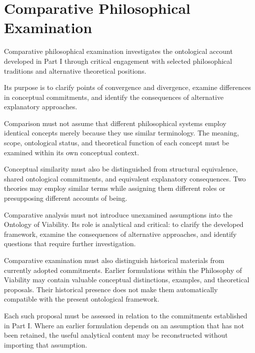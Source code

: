 
\section*{Comparative Philosophical Examination}

Comparative philosophical examination investigates
the ontological account developed in Part I through
critical engagement with selected philosophical
traditions and alternative theoretical positions.

Its purpose is to clarify points of convergence and
divergence, examine differences in conceptual commitments,
and identify the consequences of alternative explanatory
approaches.

Comparison must not assume that different philosophical
systems employ identical concepts merely because they
use similar terminology. The meaning, scope, ontological
status, and theoretical function of each concept must
be examined within its own conceptual context.

Conceptual similarity must also be distinguished from
structural equivalence, shared ontological commitments,
and equivalent explanatory consequences. Two theories
may employ similar terms while assigning them different
roles or presupposing different accounts of being.

Comparative analysis must not introduce unexamined
assumptions into the Ontology of Viability. Its role
is analytical and critical: to clarify the developed
framework, examine the consequences of alternative
approaches, and identify questions that require
further investigation.

Comparative examination must also distinguish
historical materials from currently adopted commitments.
Earlier formulations within the Philosophy of Viability
may contain valuable conceptual distinctions, examples,
and theoretical proposals. Their historical presence
does not make them automatically compatible with
the present ontological framework.

Each such proposal must be assessed in relation to
the commitments established in Part I. Where an
earlier formulation depends on an assumption that
has not been retained, the useful analytical content
may be reconstructed without importing that assumption.

